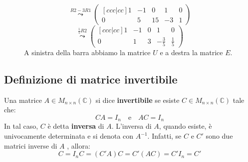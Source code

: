 \documentclass[a4paper]{article}
\theoremstyle{break}
\theoremstyle{break}
\theoremstyle{break}
\theoremstyle{break}
\begin{document}
\begin{figure}[H]
\begin{example}
\[      \stackrel{R2-3R1}{\leadsto}
      \begin{pmatrix}[ccc|cc] 
        1 & -1 & 0 & 1 & 0\\
        0 & 5 & 15 & -3 & 1
      \end{pmatrix} 
    \] 
    \[
      \stackrel{\frac{1}{5}R2}{\leadsto}
      \begin{pmatrix}[ccc|cc] 
        1 & -1 & 0 & 1 & 0\\
        0 & 1 & 3 & -\frac{3}{5} & \frac{1}{5}
      \end{pmatrix}
    \] 
    A sinistra della barra abbiamo la matrice \( U \) e a destra la matrice \( E \).
  \end{example}
\end{figure}

\subsection{Definizione di matrice invertibile}
Una matrice \( A \in M_{n \times n}(\mathbb{C}) \) si dice \textbf{invertibile} se esiste
\( C \in M_{n \times n}(\mathbb{C}) \) tale che:
\[
  CA = I_n \quad \text{e} \quad AC = I_n
\]
In tal caso, \( C \) è detta \textbf{inversa} di \( A \). L'inversa di \( A \), quando
esiste, è univocamente determinata e si denota con \( A^{-1} \). Infatti, se \( C \) e \( C' \) 
sono due matrici inverse di \( A \) , allora:
\[
  C = I_nC = (C'A)C = C'(AC) = C'I_n = C'
\] 
\end{document}
